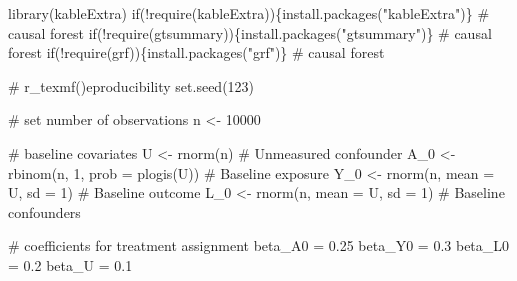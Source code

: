 \documentclass[
  singlecolumn]{article}
\newenvironment{Shaded}{}{}
\newcommand{\AttributeTok}[1]{\textcolor[rgb]{0.84,0.23,0.29}{#1}}
\newcommand{\CommentTok}[1]{\textcolor[rgb]{0.42,0.45,0.49}{#1}}
\newcommand{\ControlFlowTok}[1]{\textcolor[rgb]{0.84,0.23,0.29}{#1}}
\newcommand{\DecValTok}[1]{\textcolor[rgb]{0.00,0.36,0.77}{#1}}
\newcommand{\FloatTok}[1]{\textcolor[rgb]{0.00,0.36,0.77}{#1}}
\newcommand{\FunctionTok}[1]{\textcolor[rgb]{0.44,0.26,0.76}{#1}}
\newcommand{\NormalTok}[1]{\textcolor[rgb]{0.14,0.16,0.18}{#1}}
\newcommand{\OtherTok}[1]{\textcolor[rgb]{0.44,0.26,0.76}{#1}}
\newcommand{\SpecialCharTok}[1]{\textcolor[rgb]{0.00,0.36,0.77}{#1}}
\newcommand{\StringTok}[1]{\textcolor[rgb]{0.01,0.18,0.38}{#1}}
\begin{document}
\begin{Shaded}
\begin{Highlighting}[]
\FunctionTok{library}\NormalTok{(kableExtra)}
\ControlFlowTok{if}\NormalTok{(}\SpecialCharTok{!}\FunctionTok{require}\NormalTok{(kableExtra))\{}\FunctionTok{install.packages}\NormalTok{(}\StringTok{"kableExtra"}\NormalTok{)\} }\CommentTok{\# causal forest}
\ControlFlowTok{if}\NormalTok{(}\SpecialCharTok{!}\FunctionTok{require}\NormalTok{(gtsummary))\{}\FunctionTok{install.packages}\NormalTok{(}\StringTok{"gtsummary"}\NormalTok{)\} }\CommentTok{\# causal forest}
\ControlFlowTok{if}\NormalTok{(}\SpecialCharTok{!}\FunctionTok{require}\NormalTok{(grf))\{}\FunctionTok{install.packages}\NormalTok{(}\StringTok{"grf"}\NormalTok{)\} }\CommentTok{\# causal forest}

\CommentTok{\# r\_texmf()eproducibility}
\FunctionTok{set.seed}\NormalTok{(}\DecValTok{123}\NormalTok{) }

\CommentTok{\# set number of observations}
\NormalTok{n }\OtherTok{\textless{}{-}} \DecValTok{10000} 

\CommentTok{\# baseline covariates}
\NormalTok{U }\OtherTok{\textless{}{-}} \FunctionTok{rnorm}\NormalTok{(n) }\CommentTok{\# Unmeasured confounder}
\NormalTok{A\_0 }\OtherTok{\textless{}{-}} \FunctionTok{rbinom}\NormalTok{(n, }\DecValTok{1}\NormalTok{, }\AttributeTok{prob =} \FunctionTok{plogis}\NormalTok{(U)) }\CommentTok{\# Baseline exposure}
\NormalTok{Y\_0 }\OtherTok{\textless{}{-}} \FunctionTok{rnorm}\NormalTok{(n, }\AttributeTok{mean =}\NormalTok{ U, }\AttributeTok{sd =} \DecValTok{1}\NormalTok{) }\CommentTok{\# Baseline outcome}
\NormalTok{L\_0 }\OtherTok{\textless{}{-}} \FunctionTok{rnorm}\NormalTok{(n, }\AttributeTok{mean =}\NormalTok{ U, }\AttributeTok{sd =} \DecValTok{1}\NormalTok{) }\CommentTok{\# Baseline confounders}

\CommentTok{\# coefficients for treatment assignment}
\NormalTok{beta\_A0 }\OtherTok{=} \FloatTok{0.25}
\NormalTok{beta\_Y0 }\OtherTok{=} \FloatTok{0.3}
\NormalTok{beta\_L0 }\OtherTok{=} \FloatTok{0.2}
\NormalTok{beta\_U }\OtherTok{=} \FloatTok{0.1}


\end{Highlighting}
\end{Shaded}
\end{document}
